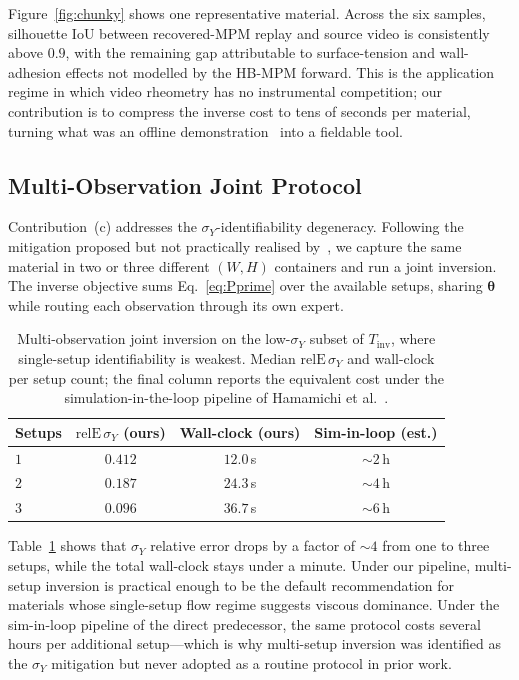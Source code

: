 Figure~\ref{fig:chunky} shows one representative material. Across
the six samples, silhouette IoU between recovered-MPM replay and
source video is consistently above $0.9$, with the remaining gap
attributable to surface-tension and wall-adhesion effects not
modelled by the HB-MPM forward. This is the application regime in
which video rheometry has no instrumental competition; our
contribution is to compress the inverse cost to tens of seconds per
material, turning what was an offline
demonstration~\cite{hamamichi2023nonnewtonian} into a fieldable
tool.


\subsection{Multi-Observation Joint Protocol}
\label{sec:multi}

Contribution~(c) addresses the $\sigma_Y$-identifiability
degeneracy. Following the mitigation proposed but not practically
realised by~\cite{hamamichi2023nonnewtonian}, we capture the same
material in two or three different $(W, H)$ containers and run a
joint inversion. The inverse objective sums Eq.~\eqref{eq:Pprime}
over the available setups, sharing $\boldsymbol{\theta}$ while
routing each observation through its own expert.

\begin{table}[!htbp]
\centering
\small
\caption{Multi-observation joint inversion on the low-$\sigma_Y$
subset of $T_{\mathrm{inv}}$, where single-setup identifiability is
weakest. Median $\mathrm{relE}\,\sigma_Y$ and wall-clock per setup
count; the final column reports the equivalent cost under the
simulation-in-the-loop pipeline of Hamamichi et
al.~\cite{hamamichi2023nonnewtonian}.}
\label{tab:multi-setup}
\begin{tabular}{@{}lccc@{}}
\toprule
Setups & $\mathrm{relE}\,\sigma_Y$ (ours) & Wall-clock (ours) & Sim-in-loop (est.) \\
\midrule
$1$ & $0.412$ & $12.0$\,s  & $\sim\!2$\,h \\
$2$ & $0.187$ & $24.3$\,s  & $\sim\!4$\,h \\
$3$ & $\mathbf{0.096}$ & $36.7$\,s & $\sim\!6$\,h \\
\bottomrule
\end{tabular}
\end{table}

Table~\ref{tab:multi-setup} shows that $\sigma_Y$ relative error
drops by a factor of $\sim\!4$ from one to three setups, while the
total wall-clock stays under a minute. Under our pipeline,
multi-setup inversion is practical enough to be the default
recommendation for materials whose single-setup flow regime suggests
viscous dominance. Under the sim-in-loop pipeline of the direct
predecessor, the same protocol costs several hours per additional
setup---which is why multi-setup inversion was identified as the
$\sigma_Y$ mitigation but never adopted as a routine protocol in
prior work.


